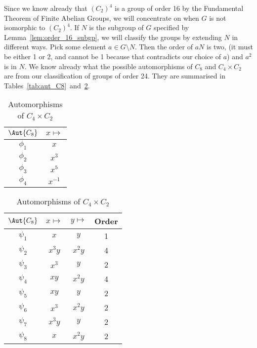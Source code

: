 Since we know already that \({(C_2)}^4\) is a group of order 16 by the Fundamental Theorem of Finite Abelian Groups, we
will concentrate on when \(G\) is not isomorphic to \({(C_2)}^4\).
If \(N\) is the subgroup of \(G\) specified by Lemma~\ref{lem:order_16_subgp}, we will classify the groups by extending
\(N\) in different ways.
Pick some element \(a \in G \setminus N\).
Then the order of \(aN\) is two, (it must be either 1 or 2, and cannot be 1 because that contradicts our choice of
\(a\)) and \(a^2\) is in \(N\).
We know already what the possible automorphisms of \(C_8\) and \(C_4 \times C_2\) are from our classification of groups
of order 24.
They are summarised in Tables~\ref{tab:aut_C8}~and~\ref{tab:aut_C4xC2}.

\begin{table}
    \begin{minipage}{0.5\linewidth}
        \caption{Automorphisms of \(C_8\)}\label{tab:aut_C8}
        \centering
        \begin{tabular}{c|c}
            \(\Aut{C_8}\) & \(x \mapsto\) \\
            \midrule
            \(\phi_1\) & \(x\) \\
            \(\phi_2\) & \(x^3\) \\
            \(\phi_3\) & \(x^5\) \\
            \(\phi_4\) & \(x^{-1}\)
        \end{tabular}
    \end{minipage}
    \begin{minipage}{0.5\linewidth}
        \caption{Automorphisms of \(C_4 \times C_2\)}\label{tab:aut_C4xC2}
        \centering
        \begin{tabular}{c|c|c|c}
            \(\Aut{C_8}\) & \(x \mapsto\) & \(y \mapsto\) & Order \\
            \midrule
            \(\psi_1\) & \(x\) & \(y\) & 1\\
            \(\psi_2\) & \(x^3 y\) & \(x^2 y\) & 4 \\
            \(\psi_3\) & \(x^3\) & \(y\) & 2 \\
            \(\psi_4\) & \(xy\) & \(x^2 y\) & 4 \\
            \(\psi_5\) & \(xy\) & \(y\) & 2 \\
            \(\psi_6\) & \(x^3\) & \(x^2 y\) & 2\\
            \(\psi_7\) & \(x^3 y\) & \(y\) & 2 \\
            \(\psi_8\) & \(x\) & \(x^2 y\) & 2 \\
        \end{tabular}
    \end{minipage}
\end{table}

